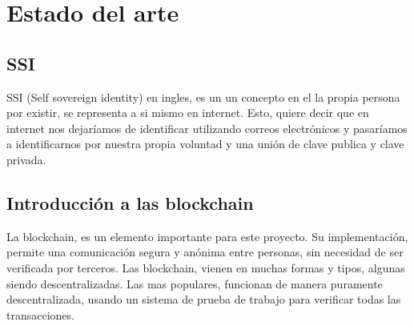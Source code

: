 \chapter{Estado del arte}\label{EdA}

\thispagestyle{fancy}


\section*{SSI}
SSI (Self sovereign identity) en ingles, es un un concepto en el la propia persona por existir, se representa a si mismo en internet. Esto, quiere decir que en internet nos dejaríamos de identificar utilizando correos electrónicos y pasaríamos a identificarnos por nuestra propia voluntad y una unión de clave publica y clave privada.

\section*{Introducción a las blockchain}
La blockchain, es un elemento importante para este proyecto. Su implementación, permite una comunicación segura y anónima entre personas, sin necesidad de ser verificada por terceros. Las blockchain, vienen en muchas formas y tipos, algunas siendo descentralizadas. Las mas populares, funcionan de manera puramente descentralizada, usando un sistema de prueba de trabajo para verificar todas las transacciones.
